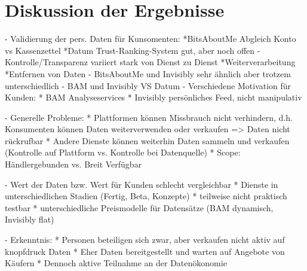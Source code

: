 \section{Diskussion der Ergebnisse}

- Validierung der pers. Daten für Kunsomenten: 
    *BitsAboutMe Abgleich Konto vs Kassenzettel
    *Datum Trust-Ranking-System gut, aber noch offen
- Kontrolle/Transparenz variiert stark von Dienst zu Dienst
    *Weiterverarbeitung
    *Entfernen von Daten
- BitsAboutMe und Invisibly sehr ähnlich aber trotzem unterschiedlich
- BAM und Invisibly VS Datum
- Verschiedene Motivation für Kunden:
    * BAM Analyseservices
    * Invisibly persönliches Feed, nicht manipulativ


- Generelle Probleme:
    * Plattformen können Missbrauch nicht verhindern, d.h. Konsumenten können Daten weiterverwenden oder verkaufen => Daten nicht rückrufbar
    * Andere Dienste können weiterhin Daten sammeln und verkaufen (Kontrolle auf Plattform vs. Kontrolle bei Datenquelle)
    * Scope: Händlergebunden vs. Breit Verfügbar

- Wert der Daten bzw. Wert für Kunden schlecht vergleichbar
    * Dienste in unterschiedlichen Stadien (Fertig, Beta, Konzepte)
    * teilweise nicht praktisch testbar
    * unterschiedliche Preismodelle für Datensätze (BAM dynamisch, Invisibly flat)

- Erkenntnis:
    * Personen beteiligen sich zwar, aber verkaufen nicht aktiv auf knopfdruck Daten
    * Eher Daten bereitgestellt und warten auf Angebote von Käufern
    * Dennoch aktive Teilnahme an der Datenökonomie